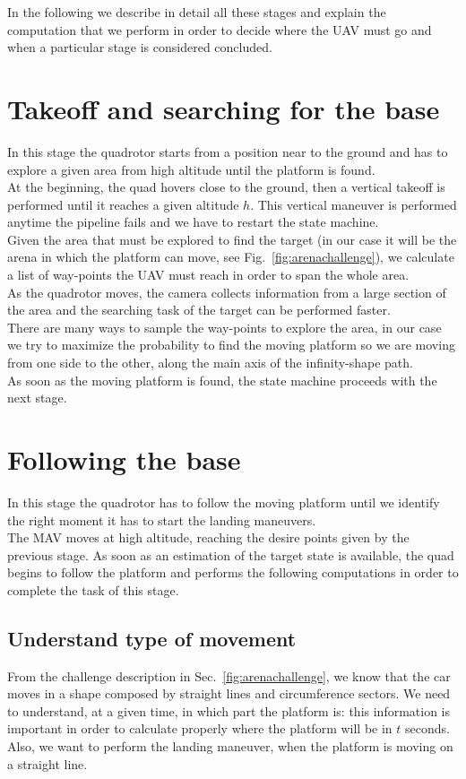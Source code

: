 In the following we describe in detail all these stages and explain the computation that we perform in order to decide where the UAV must go and when a particular stage is considered concluded.


\section{Takeoff and searching for the base}
In this stage the quadrotor starts from a position near to the ground and has to explore a given area from high altitude until the platform is found.\\

At the beginning, the quad hovers close to the ground, then a vertical takeoff is performed until it reaches a given altitude $h$. This vertical maneuver is performed anytime the pipeline fails and we have to restart the state machine.\\
Given the area that must be explored to find the target (in our case it will be the arena in which the platform can move, see Fig.~\ref{fig:arenachallenge}), we calculate a list of way-points the UAV must reach in order to span the whole area.\\
As the quadrotor moves, the camera collects information from a large section of the area and the searching task of the target can be performed faster.\\
There are many ways to sample the way-points to explore the area, in our case we try to maximize the probability to find the moving platform so we are moving from one side to the other, along the main axis of the infinity-shape path.\\

As soon as the moving platform is found, the state machine proceeds with the next stage.

\section{Following the base}
In this stage the quadrotor has to follow the moving platform until we identify the right moment it has to start the landing maneuvers.\\

The MAV moves at high altitude, reaching the desire points given by the previous stage.  As soon as an estimation of the target state is available, the quad begins to follow the platform and performs the following computations in order to complete the task of this stage.

\subsection{Understand type of movement}
From the challenge description in Sec.~\ref{fig:arenachallenge}, we know that the car moves in a shape composed by straight lines and circumference sectors. We need to understand, at a given time, in which part the platform is: this information is important in order to calculate properly where the platform will be in $t$ seconds. Also, we want to perform the landing maneuver, when the platform is moving on a straight line.\\

